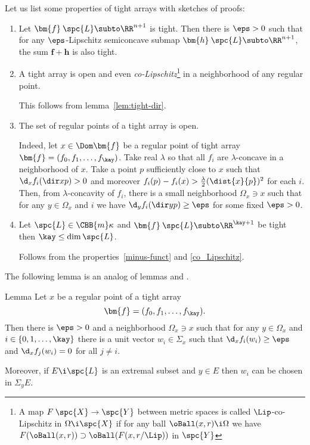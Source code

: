 Let us list some properties of tight arrays with sketches of proofs:
\begin{enumerate}

\item\label{lip+} 
Let $\bm{f}\:\spc{L}\subto\RR^{n+1}$ is tight. 
Then there is $\eps>0$ such that for any $\eps$-Lipschitz semiconcave submap $\bm{h}\:\spc{L}\subto\RR^{n+1}$, the sum 
$\bm{f}+\bm{h}$ is also tight.

\item\label{co_Lipschitz} A tight array is open and even \emph{co-Lipschitz}\footnote{A map $F\: \spc{X}\to \spc{Y}$ between
metric spaces is called $\Lip$-co-Lipschitz in $\Omega\i \spc{X}$ if for any ball $\oBall(x,r)\i
\Omega$ we have $F(\oBall(x,r))\supset \oBall(F(x,r/\Lip))$ in $\spc{Y}$} in a neighborhood of
any regular point.

This follows from lemma~\ref{lem:tight-dir}.

\item \label{open-reg}
The set of regular points of a tight array is open. 

Indeed, let $x\in\Dom \bm{f}$ be a regular point of tight array $\bm{f}=(f_0,f_1,\dots,f_\kay)$. 
Take real $\lambda$ so that all $f_i$ are $\lambda$-concave in a neighborhood of
$x$.
Take a point $p$ sufficiently close to $x$ such that $\d_x f_i(\dir x p)>0$
and moreover $f_i(p)-f_i(x)>\tfrac\lambda2(\dist{x}{p})^2$ for each $i$.
Then, from $\lambda$-concavity of $f_i$, there is a small neighborhood
$\Omega_x\ni x$ such that for any $y\in\Omega_x$ and $i$ we have $\d_y
f_i(\dir y p)\ge\eps$
for some fixed $\eps>0$.

\item Let $\spc{L}\in\CBB{m}\kappa$ and $\bm{f}\:\spc{L}\subto\RR^{\kay+1}$ be tight then $\kay\le\dim \spc{L}$.

Follows from the properties~\ref{minus-funct} and \ref{co_Lipschitz}.
\end{enumerate}

The following lemma is an analog of lemmas 
\cite[2.3]{perelman:morse} and \cite[2.2]{perelman:DC}.

\begin{thm}{Lemma}\label{lem:tight-dir} Let $x$ be a regular point of a tight
array $$\bm{f}=(f_0,f_1,\dots,f_\kay).$$
Then there is $\eps>0$ and a neighborhood $\Omega_x\ni x$ such that for any
$y\in \Omega_x$ and $i\in\{0,1,\dots,\kay\}$ there is a unit vector $w_i\in \Sigma_x$
such that $\d_x f_i(w_i)\ge\eps$ and $\d_x f_j(w_i)=0$ for all $j\not=i$. 

Moreover, if $E\i \spc{L}$ is an extremal subset and $y\in E$ then $w_i$ can be
chosen in $\Sigma_y E$.

\end{thm}

